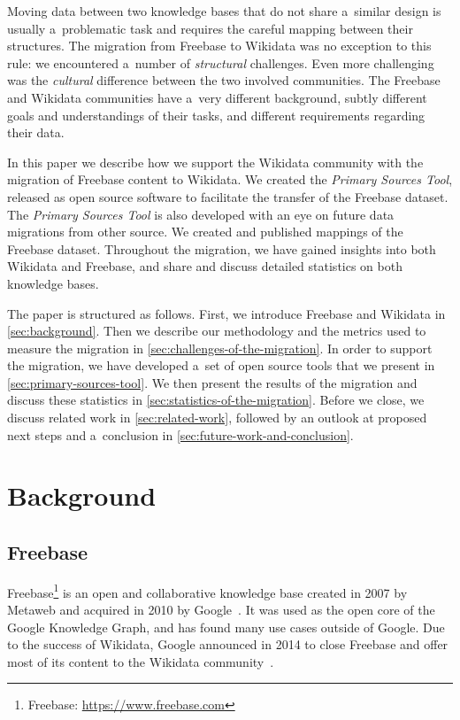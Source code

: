 \documentclass{acm_proc_article-sp}
\begin{document}
Moving data between two knowledge bases that do not share a~similar design
is usually a~problematic task and requires the careful mapping between their structures.
The migration from Freebase to Wikidata was no exception to this rule:
we encountered a~number of \emph{structural} challenges.
Even more challenging was the \emph{cultural} difference between the two involved communities.
The Freebase and Wikidata communities have a~very different background,
subtly different goals and understandings of their tasks,
and different requirements regarding their data.

In this paper we describe how we support the Wikidata community with
the migration of Freebase content to Wikidata.
We created the \emph{Primary Sources Tool},
released as open source software to facilitate the transfer of the Freebase dataset.
The \emph{Primary Sources Tool} is also developed with an eye on
future data migrations from other source.
We created and published mappings of the Freebase dataset.
Throughout the migration, we have gained insights into both Wikidata and Freebase,
and share and discuss detailed statistics on both knowledge bases. 

The paper is structured as follows.
First, we introduce Freebase and Wikidata in \autoref{sec:background}.
Then we describe our methodology and the metrics used to measure the migration
in \autoref{sec:challenges-of-the-migration}.
In order to support the migration, we have developed a~set of open source tools
that we present in \autoref{sec:primary-sources-tool}.
We then present the results of the migration
and discuss these statistics in \autoref{sec:statistics-of-the-migration}.
Before we close, we discuss related work in \autoref{sec:related-work},
followed by an outlook at proposed next steps
and a~conclusion in \autoref{sec:future-work-and-conclusion}.

\section{Background}\label{sec:background}

\subsection{Freebase}

Freebase\footnote{Freebase: \url{https://www.freebase.com}} is an open and
collaborative knowledge base created in 2007 by Metaweb and 
acquired in 2010 by Google~\cite{freebase}.
It was used as the open core of the Google Knowledge Graph,
and has found many use cases outside of Google.
Due to the success of Wikidata,
Google announced in 2014 to close Freebase and offer most of its content to the
Wikidata community~\cite{freebase-end}.
\end{document}
